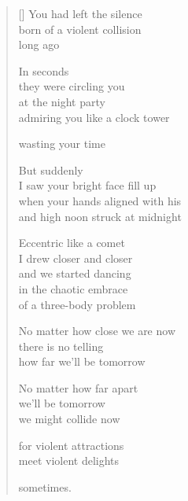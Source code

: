 \documentclass[12pt,a4paper]{article}
\begin{document}
\thispagestyle{empty}


\settowidth{\versewidth}{born of a violent collision long ago.}

\bigskip

\begin{verse}[\versewidth]
  You had left the silence \\
  born of a violent collision \\
  long ago

  In seconds \\
  they were circling you \\
  at the night party \\
  admiring you like a clock tower

  wasting your time

  But suddenly \\
  I saw your bright face fill up \\
  when your hands aligned with his \\
  and high noon struck at midnight

  Eccentric like a comet \\
  I drew closer and closer \\
  and we started dancing \\
  in the chaotic embrace \\
  of a three-body problem

  No matter how close we are now \\
  there is no telling \\
  how far we'll be tomorrow

  No matter how far apart \\
  we'll be tomorrow \\
  we might collide now

  for violent attractions \\
  meet violent delights

  sometimes.
\end{verse}
\end{document}
